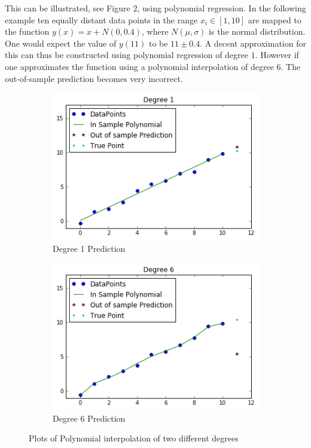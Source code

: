 \documentclass[11pt, letterpaper]{amsart}
\begin{document}
This can be illustrated, see Figure 2, using polynomial regression. In the following example ten equally distant data points in the range $x_i\in[1,10]$ are mapped to the function $y(x) = x + N(0,0.4)$, where $N(\mu,\sigma)$ is the normal distribution. One would expect the value of $y(11)$ to be $11 \pm 0.4$. A decent approximation for this can thus be constructed using polynomial regression of degree $1$. However if one approximates the function using a polynomial interpolation of degree $6$. The out-of-sample prediction becomes very incorrect.
\\
\begin{figure}[h]
\centering
\begin{subfigure}{0.5\textwidth}
  \centering
  \includegraphics[width=1\linewidth]{overfit1.png}
  \caption{Degree 1 Prediction}
  \label{fig:sub1}
\end{subfigure}%
\begin{subfigure}{.5\textwidth}
  \centering
  \includegraphics[width=1\linewidth]{overfit2.png}
  \caption{Degree 6 Prediction}
  \label{fig:sub2}
\end{subfigure}
\caption{Plots of Polynomial interpolation of two different degrees}
\label{fig:test}
\end{figure}
\end{document}
